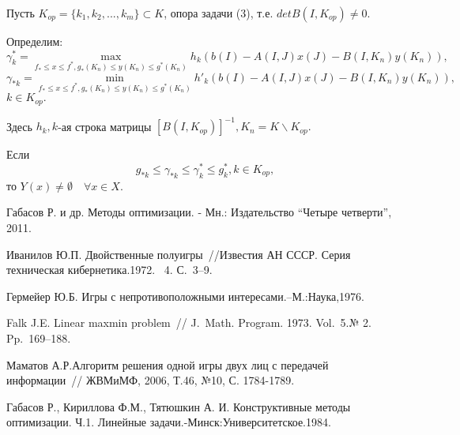  Пусть  $K_{op}=\{k_{1},k_2,...,k_m\} \subset K$,
опора \cite{mmGabasov2} задачи (3), т.е. $detB(I,K_{op})\neq0.$

Определим:
$$\gamma^{*}_k=\max_{f_*\leq x \leq f^*,g_*(K_n)\leq y(K_n) \leq
g^*(K_n)}h_k(b(I)-A(I,J)x(J)-B(I,K_n)y(K_n)),$$
$$\gamma_{*k}=\min_{f_*\leq x \leq f^*,g_*(K_n)\leq y(K_n) \leq
g^*(K_n)}h'_k(b(I)-A(I,J)x(J)-B(I,K_n)y(K_n)),$$
$k\in K_{op}.$

Здесь $h_k, k$-ая строка матрицы $[{B}(I,K_{op})]^{-1}, K_n=K \backslash K_{op}.$

 \begin{theorem} Если
  $${g}_{*k}\leq  \gamma_{*k} \leq \gamma^{*}_k \leq g^{*}_k, k\in
K_{op}, $$ 
 то $Y(x)\ne \emptyset \quad \forall x \in X.$
\end{theorem}



\begin{thebibliography}{9} %
 Габасов Р. и др. Методы оптимизации. - Мн.:  Издательство
``Четыре четверти'', 2011.

 Иванилов Ю.П. Двойственные полуигры~//Известия АН СССР. Серия
техническая кибернетика.1972. \textnumero~4. С.~3--9.

 Гермейер Ю.Б. Игры с непротивоположными интересами.--М.:Наука,1976.


 Falk J.E. Linear maxmin problem~// J.~Math. Program. 1973. Vol.~5.№ 2. Pp.~169--188.

 Маматов А.Р.Алгоритм решения одной игры двух лиц
с передачей информации~// ЖВМиМФ, 2006, Т.46, №10, С. 1784-1789.

 Габасов Р., Кириллова Ф.М., Тятюшкин А. И. Конструктивные
методы оптимизации. Ч.1. Линейные задачи.-Минск:Университетское.1984.


\end{thebibliography}





%

